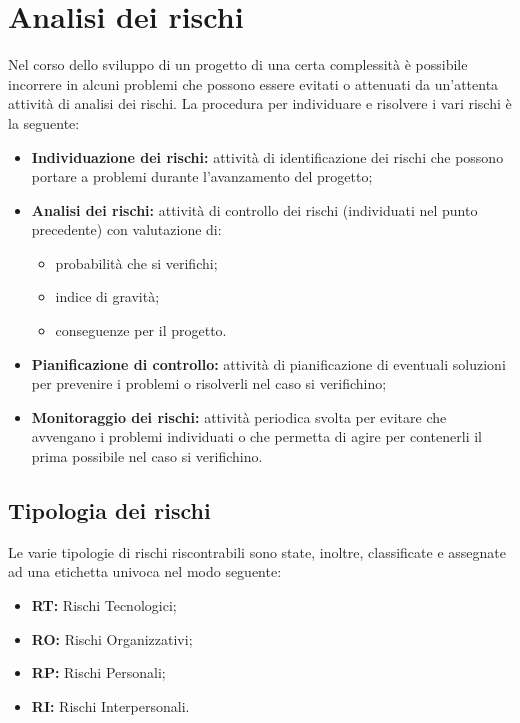 \section{Analisi dei rischi}

Nel corso dello sviluppo di un progetto di una certa complessità è possibile incorrere in alcuni problemi che possono essere evitati o attenuati da un'attenta attività di analisi dei rischi. La procedura per individuare e risolvere i vari rischi è la seguente:
\begin{itemize}
\item \textbf{Individuazione dei rischi:} attività di identificazione dei rischi che possono portare a problemi durante l'avanzamento del progetto;
\item \textbf{Analisi dei rischi:} attività di controllo dei rischi (individuati nel punto precedente) con valutazione di:
\begin{itemize}
\item probabilità che si verifichi;
\item indice di gravità;
\item conseguenze per il progetto.
\end{itemize}
\item \textbf{Pianificazione di controllo:} attività di pianificazione di eventuali soluzioni per prevenire i problemi o risolverli nel caso si verifichino;
\item \textbf{Monitoraggio dei rischi:} attività periodica svolta per evitare che avvengano i problemi individuati o che permetta di agire per contenerli il prima possibile nel caso si verifichino.
\end{itemize}

\subsection{Tipologia dei rischi}
Le varie tipologie di rischi riscontrabili sono state, inoltre, classificate e assegnate ad una etichetta univoca nel modo seguente:
\begin{itemize}
\item \textbf{RT:} Rischi Tecnologici;
\item \textbf{RO:} Rischi Organizzativi;
\item \textbf{RP:} Rischi Personali;
\item \textbf{RI:} Rischi Interpersonali.
\end{itemize} 

